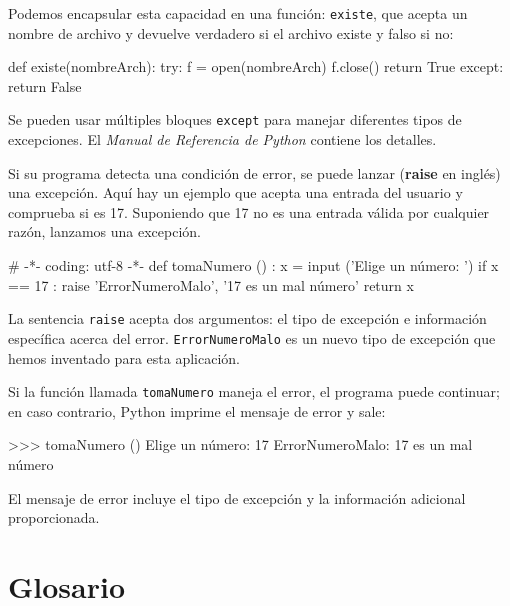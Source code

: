 Podemos encapsular esta capacidad en una función: \texttt{existe},
que acepta un nombre de archivo y devuelve verdadero si el archivo
existe y falso si no:
\begin{pythoncode}
def existe(nombreArch):
  try:
    f = open(nombreArch)
    f.close()
    return True
  except:
    return False
\end{pythoncode}
Se pueden usar múltiples bloques \texttt{except} para manejar diferentes
tipos de excepciones. El {\em Manual de Referencia de Python} contiene
los detalles.

Si su programa detecta una condición de error, se puede lanzar (\textbf{raise}
en inglés) una excepción. Aquí hay un ejemplo que acepta una entrada
del usuario y comprueba si es 17. Suponiendo que 17 no es una entrada
válida por cualquier razón, lanzamos una excepción.
\begin{pythoncode}
# -*- coding: utf-8 -*-
def tomaNumero () :                 
  x = input ('Elige un número: ')   
  if x == 17 :
    raise 'ErrorNumeroMalo', '17 es un mal número'
  return x
\end{pythoncode}

La sentencia \texttt{raise} acepta dos argumentos: el tipo de excepción
e información específica acerca del error. \texttt{ErrorNumeroMalo}
es un nuevo tipo de excepción que hemos inventado para esta aplicación.

Si la función llamada \texttt{tomaNumero} maneja el error, el programa
puede continuar; en caso contrario, Python imprime el mensaje de error
y sale:
\begin{pyconcode}
>>> tomaNumero ()
Elige un número: 17
ErrorNumeroMalo: 17 es un mal número
\end{pyconcode}

El mensaje de error incluye el tipo de excepción y la información
adicional proporcionada.

\section{Glosario}

